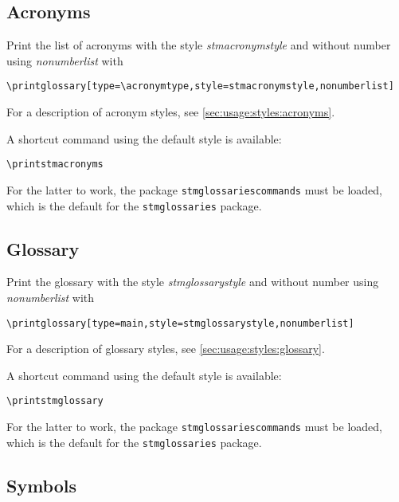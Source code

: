 \documentclass[%
  type=article,%
  layout=koma,%
  hyperref=true,%
  conditionallox=true,%
  conditionalloxnewpage=false,%
  date=true,%
  index=true,%
  listings=true%
]{stmtext}
\begin{document}
\subsection{Acronyms}
\label{sec:usage:document:acronyms}

Print the list of acronyms with the style \textit{stmacronymstyle} and without number using \textit{nonumberlist} with

\begin{verbatim}
\printglossary[type=\acronymtype,style=stmacronymstyle,nonumberlist]
\end{verbatim}

For a description of acronym styles, see \autoref{sec:usage:styles:acronyms}.

A shortcut command using the default style is available:

\begin{verbatim}
\printstmacronyms
\end{verbatim}

For the latter to work, the package \texttt{stmglossariescommands} must be loaded, which is the default for the \texttt{stmglossaries} package.

\subsection{Glossary}
\label{sec:usage:document:glossary}

Print the glossary with the style \textit{stmglossarystyle} and without number using \textit{nonumberlist} with

\begin{verbatim}
\printglossary[type=main,style=stmglossarystyle,nonumberlist]
\end{verbatim}

For a description of glossary styles, see \autoref{sec:usage:styles:glossary}.

A shortcut command using the default style is available:

\begin{verbatim}
\printstmglossary
\end{verbatim}

For the latter to work, the package \texttt{stmglossariescommands} must be loaded, which is the default for the \texttt{stmglossaries} package.

\subsection{Symbols}
\label{sec:usage:document:symbols}
\end{document}
